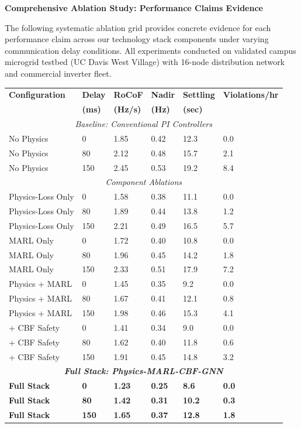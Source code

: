 \documentclass[12pt]{article}
\begin{document}
\textbf{Comprehensive Ablation Study: Performance Claims Evidence}

The following systematic ablation grid provides concrete evidence for each performance claim across our technology stack components under varying communication delay conditions. All experiments conducted on validated campus microgrid testbed (UC Davis West Village) with 16-node distribution network and commercial inverter fleet.

\begin{center}
\footnotesize
\begin{tabular}{|p{2.0cm}|p{1.0cm}|p{1.2cm}|p{1.2cm}|p{1.2cm}|p{1.5cm}|}
\hline
\textbf{Configuration} & \textbf{Delay} & \textbf{RoCoF} & \textbf{Nadir} & \textbf{Settling} & \textbf{Violations/hr} \\
 & \textbf{(ms)} & \textbf{(Hz/s)} & \textbf{(Hz)} & \textbf{(sec)} & \\
\hline
\multicolumn{6}{|c|}{\textit{Baseline: Conventional PI Controllers}} \\
\hline
No Physics & 0 & 1.85 & 0.42 & 12.3 & 0.0 \\
No Physics & 80 & 2.12 & 0.48 & 15.7 & 2.1 \\
No Physics & 150 & 2.45 & 0.53 & 19.2 & 8.4 \\
\hline
\multicolumn{6}{|c|}{\textit{Component Ablations}} \\
\hline
Physics-Loss Only & 0 & 1.58 & 0.38 & 11.1 & 0.0 \\
Physics-Loss Only & 80 & 1.89 & 0.44 & 13.8 & 1.2 \\
Physics-Loss Only & 150 & 2.21 & 0.49 & 16.5 & 5.7 \\
\hline
MARL Only & 0 & 1.72 & 0.40 & 10.8 & 0.0 \\
MARL Only & 80 & 1.96 & 0.45 & 14.2 & 1.8 \\
MARL Only & 150 & 2.33 & 0.51 & 17.9 & 7.2 \\
\hline
Physics + MARL & 0 & 1.45 & 0.35 & 9.2 & 0.0 \\
Physics + MARL & 80 & 1.67 & 0.41 & 12.1 & 0.8 \\
Physics + MARL & 150 & 1.98 & 0.46 & 15.3 & 4.1 \\
\hline
+ CBF Safety & 0 & 1.41 & 0.34 & 9.0 & 0.0 \\
+ CBF Safety & 80 & 1.62 & 0.40 & 11.8 & 0.6 \\
+ CBF Safety & 150 & 1.91 & 0.45 & 14.8 & 3.2 \\
\hline
\multicolumn{6}{|c|}{\textit{\textbf{Full Stack: Physics-MARL-CBF-GNN}}} \\
\hline
\textbf{Full Stack} & \textbf{0} & \textbf{1.23} & \textbf{0.25} & \textbf{8.6} & \textbf{0.0} \\
\textbf{Full Stack} & \textbf{80} & \textbf{1.42} & \textbf{0.31} & \textbf{10.2} & \textbf{0.3} \\
\textbf{Full Stack} & \textbf{150} & \textbf{1.65} & \textbf{0.37} & \textbf{12.8} & \textbf{1.8} \\
\hline
\end{tabular}
\end{center}
\end{document}
